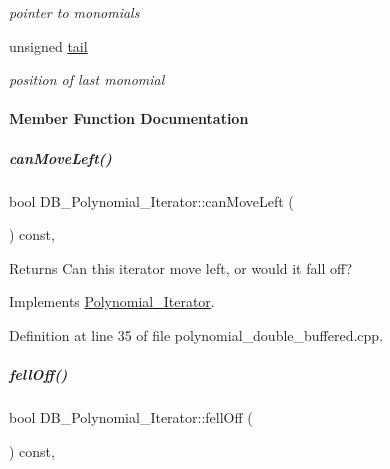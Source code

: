 \begin{DoxyCompactItemize}
\begin{DoxyCompactList}\small\item\em pointer to monomials \end{DoxyCompactList}\item 
\mbox{\label{group___iterator_group_a57a302fde5b37005fc52d8d022d7284f}} 
unsigned \hyperlink{group___iterator_group_a57a302fde5b37005fc52d8d022d7284f}{tail}
\begin{DoxyCompactList}\small\item\em position of last monomial \end{DoxyCompactList}\end{DoxyCompactItemize}


\paragraph{Member Function Documentation}
\mbox{\label{group___iterator_group_a4094a88fd6d77894ff04960efd492ec6}} 
\subparagraph{\texorpdfstring{can\+Move\+Left()}{canMoveLeft()}}
{\footnotesize\ttfamily bool D\+B\+\_\+\+Polynomial\+\_\+\+Iterator\+::can\+Move\+Left (\begin{DoxyParamCaption}{ }\end{DoxyParamCaption}) const\hspace{0.3cm}{\ttfamily [override]}, {\ttfamily [virtual]}}

\begin{DoxyReturn}{Returns}
Can this iterator move left, or would it fall off? 
\end{DoxyReturn}


Implements \hyperlink{group___iterator_group_a7ab348897446bc182500f84df8a9e590}{Polynomial\+\_\+\+Iterator}.



Definition at line 35 of file polynomial\+\_\+double\+\_\+buffered.\+cpp.

\mbox{\label{group___iterator_group_aa5ee700b0d03a9e333f55a87b2439920}} 
\subparagraph{\texorpdfstring{fell\+Off()}{fellOff()}}
{\footnotesize\ttfamily bool D\+B\+\_\+\+Polynomial\+\_\+\+Iterator\+::fell\+Off (\begin{DoxyParamCaption}{ }\end{DoxyParamCaption}) const\hspace{0.3cm}{\ttfamily [override]}, {\ttfamily [virtual]}}

